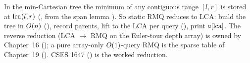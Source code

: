 \begin{recallbox}
In the min-Cartesian tree the minimum of any contiguous range $[l,r]$ is stored at $\operatorname{lca}(l,r)$
(, from the span lemma ). So static RMQ reduces to LCA: build the
tree in $O(n)$ (), record parents, lift to the LCA per query
(), print $a[\operatorname{lca}]$. The reverse reduction (LCA $\to$ RMQ on the Euler-tour depth array)
is owned by Chapter~16 (); a pure array-only $O(1)$-query RMQ is the sparse table of
Chapter~19 (). CSES 1647 () is the worked reduction.
\end{recallbox}

